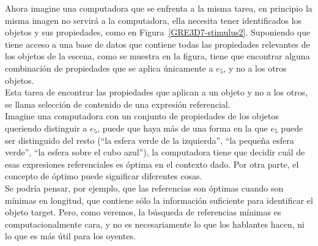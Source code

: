 Ahora imagine una computadora que se enfrenta a la misma
tarea, en principio la misma imagen no servir\'a a la computadora, ella necesita tener identificados los objetos y sus propiedades, como en Figura~\ref{GRE3D7-stimulus2}. Suponiendo que tiene acceso a una base de datos que contiene todas
las propiedades relevantes de los objetos de la escena, como se muestra en la figura, tiene que encontrar alguna
combinaci\'on de propiedades que se aplica \'unicamente a $e_5$, y no a los otros objetos.\\

Esta tarea de encontrar las propiedades que aplican a un objeto y no a los otros, se llama selecci\'on de contenido de una expresi\'on referencial.  \\

Imagine una computadora con un conjunto de propiedades de los objetos queriendo distinguir a $e_5$, puede que haya m\'as de una forma en la que $e_5$ puede ser distinguido del resto (``la esfera verde de la izquierda'', ``la peque\~na esfera verde'', ``la esfera sobre el cubo azul''), la computadora tiene que decidir cu\'al de esas expresiones referenciales es \'optima en el contexto dado. Por otra parte, el concepto de \'optimo puede significar diferentes cosas.\\

Se podr\'{i}a pensar, por ejemplo, que las referencias son \'optimas cuando son m\'{i}nimas en longitud,
que contiene s\'olo la informaci\'on suficiente para identificar el objeto target. Pero, como veremos, la b\'usqueda de referencias m\'{i}nimas
es computacionalmente cara, y no es necesariamente lo que los hablantes hacen, ni lo que es m\'as \'util para los oyentes.\\



